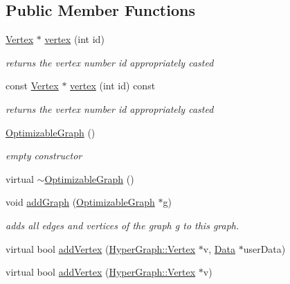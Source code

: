 \subsection*{Public Member Functions}
\begin{DoxyCompactItemize}
\item 
\mbox{\hyperlink{classg2o_1_1_optimizable_graph_1_1_vertex}{Vertex}} $\ast$ \mbox{\hyperlink{structg2o_1_1_optimizable_graph_a19e014e8ec2e9a6e894da8c3a8f8e50d}{vertex}} (int id)
\begin{DoxyCompactList}\small\item\em returns the vertex number {\itshape id} appropriately casted \end{DoxyCompactList}\item 
const \mbox{\hyperlink{classg2o_1_1_optimizable_graph_1_1_vertex}{Vertex}} $\ast$ \mbox{\hyperlink{structg2o_1_1_optimizable_graph_a0e55fa99a49824af2711c0fcaf02ac1a}{vertex}} (int id) const
\begin{DoxyCompactList}\small\item\em returns the vertex number {\itshape id} appropriately casted \end{DoxyCompactList}\item 
\mbox{\hyperlink{structg2o_1_1_optimizable_graph_acc459c08fd5e743cf2072e740ffc5025}{Optimizable\+Graph}} ()
\begin{DoxyCompactList}\small\item\em empty constructor \end{DoxyCompactList}\item 
virtual \mbox{\hyperlink{structg2o_1_1_optimizable_graph_a98f4399dfc23cac840a64ae2d0d3898f}{$\sim$\+Optimizable\+Graph}} ()
\item 
void \mbox{\hyperlink{structg2o_1_1_optimizable_graph_acea1342d9ab0bf717710c8f78b74ff25}{add\+Graph}} (\mbox{\hyperlink{structg2o_1_1_optimizable_graph}{Optimizable\+Graph}} $\ast$g)
\begin{DoxyCompactList}\small\item\em adds all edges and vertices of the graph {\itshape g} to this graph. \end{DoxyCompactList}\item 
virtual bool \mbox{\hyperlink{structg2o_1_1_optimizable_graph_ae0b93774ce1dfa0dfd501c86ad4f773e}{add\+Vertex}} (\mbox{\hyperlink{classg2o_1_1_hyper_graph_1_1_vertex}{Hyper\+Graph\+::\+Vertex}} $\ast$v, \mbox{\hyperlink{classg2o_1_1_optimizable_graph_1_1_data}{Data}} $\ast$user\+Data)
\item 
virtual bool \mbox{\hyperlink{structg2o_1_1_optimizable_graph_ac6f41f49fe6148fbe17133d10bf29b4c}{add\+Vertex}} (\mbox{\hyperlink{classg2o_1_1_hyper_graph_1_1_vertex}{Hyper\+Graph\+::\+Vertex}} $\ast$v)

\end{DoxyCompactItemize}
